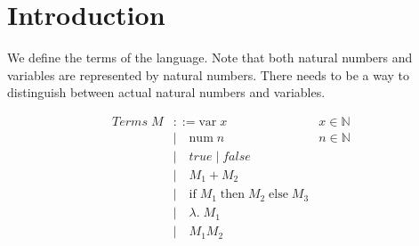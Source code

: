 \documentclass{article}
\begin{document}
\section{Introduction}

We define the terms of the language.
Note that both natural numbers and variables are represented by natural numbers.
There needs to be a way to distinguish between actual natural numbers and variables.

\begin{align*}
Terms \; M & ::= \text{var} \; x       & x \in \mathbb{N} \\
& | \quad \text{num} \; n              & n \in \mathbb{N} \\
& | \quad true \; | \; false \\
& | \quad M_1 + M_2 \\
& | \quad \text{if} \; M_1 \; \text{then} \; M_2 \; \text{else} \; M_3 \\
& | \quad \lambda . \; M_1 \\
& | \quad M_1 M_2
\end{align*}
\end{document}
